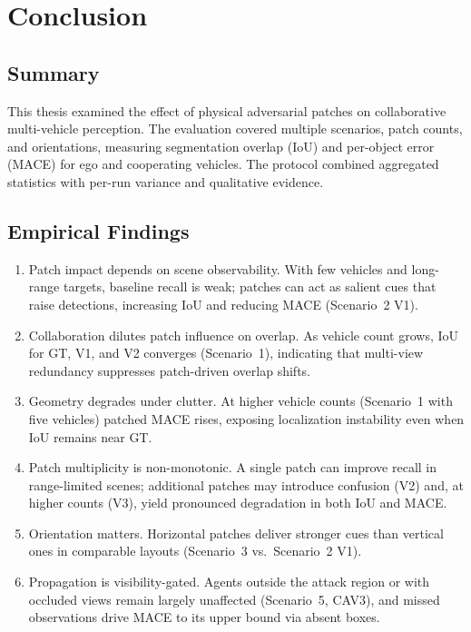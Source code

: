 \chapter{Conclusion}
\label{chap:conclusion}

\section{Summary}
This thesis examined the effect of physical adversarial patches on collaborative multi-vehicle perception. The evaluation covered multiple scenarios, patch counts, and orientations, measuring segmentation overlap (IoU) and per-object error (MACE) for ego and cooperating vehicles. The protocol combined aggregated statistics with per-run variance and qualitative evidence.

\section{Empirical Findings}
\begin{enumerate}
    \item Patch impact depends on scene observability. With few vehicles and long-range targets, baseline recall is weak; patches can act as salient cues that raise detections, increasing IoU and reducing MACE (Scenario~2 V1).
    \item Collaboration dilutes patch influence on overlap. As vehicle count grows, IoU for GT, V1, and V2 converges (Scenario~1), indicating that multi-view redundancy suppresses patch-driven overlap shifts.
    \item Geometry degrades under clutter. At higher vehicle counts (Scenario~1 with five vehicles) patched MACE rises, exposing localization instability even when IoU remains near GT.
    \item Patch multiplicity is non-monotonic. A single patch can improve recall in range-limited scenes; additional patches may introduce confusion (V2) and, at higher counts (V3), yield pronounced degradation in both IoU and MACE.
    \item Orientation matters. Horizontal patches deliver stronger cues than vertical ones in comparable layouts (Scenario~3 vs.~Scenario~2 V1).
    \item Propagation is visibility-gated. Agents outside the attack region or with occluded views remain largely unaffected (Scenario~5, CAV3), and missed observations drive MACE to its upper bound via absent boxes.
\end{enumerate}

